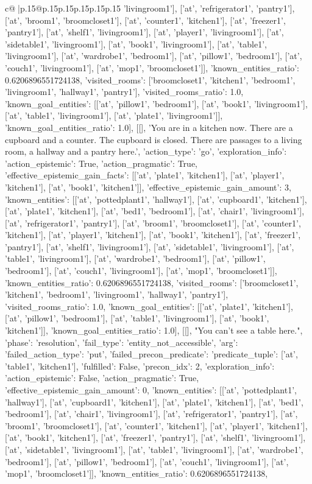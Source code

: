 \documentclass{article}
\begin{document}
{\begin{supertabular}{c@{$\;$}|p{.15\linewidth}@{}p{.15\linewidth}p{.15\linewidth}p{.15\linewidth}p{.15\linewidth}p{.15\linewidth}}
{{{'livingroom1'], ['at', 'refrigerator1', 'pantry1'], ['at', 'broom1', 'broomcloset1'], ['at', 'counter1', 'kitchen1'], ['at', 'freezer1', 'pantry1'], ['at', 'shelf1', 'livingroom1'], ['at', 'player1', 'livingroom1'], ['at', 'sidetable1', 'livingroom1'], ['at', 'book1', 'livingroom1'], ['at', 'table1', 'livingroom1'], ['at', 'wardrobe1', 'bedroom1'], ['at', 'pillow1', 'bedroom1'], ['at', 'couch1', 'livingroom1'], ['at', 'mop1', 'broomcloset1']], 'known_entities_ratio': 0.6206896551724138, 'visited_rooms': ['broomcloset1', 'kitchen1', 'bedroom1', 'livingroom1', 'hallway1', 'pantry1'], 'visited_rooms_ratio': 1.0, 'known_goal_entities': [['at', 'pillow1', 'bedroom1'], ['at', 'book1', 'livingroom1'], ['at', 'table1', 'livingroom1'], ['at', 'plate1', 'livingroom1']], 'known_goal_entities_ratio': 1.0}}], [[], 'You are in a kitchen now. There are a cupboard and a counter. The cupboard is closed. There are passages to a living room, a hallway and a pantry here.', {'action_type': 'go', 'exploration_info': {'action_epistemic': True, 'action_pragmatic': True, 'effective_epistemic_gain_facts': [['at', 'plate1', 'kitchen1'], ['at', 'player1', 'kitchen1'], ['at', 'book1', 'kitchen1']], 'effective_epistemic_gain_amount': 3, 'known_entities': [['at', 'pottedplant1', 'hallway1'], ['at', 'cupboard1', 'kitchen1'], ['at', 'plate1', 'kitchen1'], ['at', 'bed1', 'bedroom1'], ['at', 'chair1', 'livingroom1'], ['at', 'refrigerator1', 'pantry1'], ['at', 'broom1', 'broomcloset1'], ['at', 'counter1', 'kitchen1'], ['at', 'player1', 'kitchen1'], ['at', 'book1', 'kitchen1'], ['at', 'freezer1', 'pantry1'], ['at', 'shelf1', 'livingroom1'], ['at', 'sidetable1', 'livingroom1'], ['at', 'table1', 'livingroom1'], ['at', 'wardrobe1', 'bedroom1'], ['at', 'pillow1', 'bedroom1'], ['at', 'couch1', 'livingroom1'], ['at', 'mop1', 'broomcloset1']], 'known_entities_ratio': 0.6206896551724138, 'visited_rooms': ['broomcloset1', 'kitchen1', 'bedroom1', 'livingroom1', 'hallway1', 'pantry1'], 'visited_rooms_ratio': 1.0, 'known_goal_entities': [['at', 'plate1', 'kitchen1'], ['at', 'pillow1', 'bedroom1'], ['at', 'table1', 'livingroom1'], ['at', 'book1', 'kitchen1']], 'known_goal_entities_ratio': 1.0}}], [[], "You can't see a table here.", {'phase': 'resolution', 'fail_type': 'entity_not_accessible', 'arg': {'failed_action_type': 'put', 'failed_precon_predicate': {'predicate_tuple': ['at', 'table1', 'kitchen1'], 'fulfilled': False, 'precon_idx': 2}}, 'exploration_info': {'action_epistemic': False, 'action_pragmatic': True, 'effective_epistemic_gain_amount': 0, 'known_entities': [['at', 'pottedplant1', 'hallway1'], ['at', 'cupboard1', 'kitchen1'], ['at', 'plate1', 'kitchen1'], ['at', 'bed1', 'bedroom1'], ['at', 'chair1', 'livingroom1'], ['at', 'refrigerator1', 'pantry1'], ['at', 'broom1', 'broomcloset1'], ['at', 'counter1', 'kitchen1'], ['at', 'player1', 'kitchen1'], ['at', 'book1', 'kitchen1'], ['at', 'freezer1', 'pantry1'], ['at', 'shelf1', 'livingroom1'], ['at', 'sidetable1', 'livingroom1'], ['at', 'table1', 'livingroom1'], ['at', 'wardrobe1', 'bedroom1'], ['at', 'pillow1', 'bedroom1'], ['at', 'couch1', 'livingroom1'], ['at', 'mop1', 'broomcloset1']], 'known_entities_ratio': 0.6206896551724138, }}}
\end{supertabular}}
\end{document}
